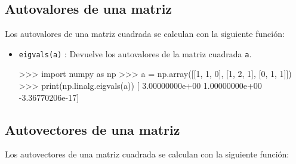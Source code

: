 \documentclass[
  spanish,
  a4paper,
]{scrreport}
\newenvironment{Shaded}{\begin{snugshade}}{\end{snugshade}}
\newcommand{\BuiltInTok}[1]{\textcolor[rgb]{0.00,0.23,0.31}{#1}}
\newcommand{\DecValTok}[1]{\textcolor[rgb]{0.68,0.00,0.00}{#1}}
\newcommand{\FloatTok}[1]{\textcolor[rgb]{0.68,0.00,0.00}{#1}}
\newcommand{\ImportTok}[1]{\textcolor[rgb]{0.00,0.46,0.62}{#1}}
\newcommand{\NormalTok}[1]{\textcolor[rgb]{0.00,0.23,0.31}{#1}}
\newcommand{\OperatorTok}[1]{\textcolor[rgb]{0.37,0.37,0.37}{#1}}
\begin{document}
\subsection{Autovalores de una matriz}\label{autovalores-de-una-matriz}

Los autovalores de una matriz cuadrada se calculan con la siguiente
función:

\begin{itemize}
\item
  \texttt{eigvals(a)} : Devuelve los autovalores de la matriz cuadrada
  \texttt{a}.

\begin{Shaded}
\begin{Highlighting}[]
\OperatorTok{\textgreater{}\textgreater{}\textgreater{}} \ImportTok{import}\NormalTok{ numpy }\ImportTok{as}\NormalTok{ np}
\OperatorTok{\textgreater{}\textgreater{}\textgreater{}}\NormalTok{ a }\OperatorTok{=}\NormalTok{ np.array([[}\DecValTok{1}\NormalTok{, }\DecValTok{1}\NormalTok{, }\DecValTok{0}\NormalTok{], [}\DecValTok{1}\NormalTok{, }\DecValTok{2}\NormalTok{, }\DecValTok{1}\NormalTok{], [}\DecValTok{0}\NormalTok{, }\DecValTok{1}\NormalTok{, }\DecValTok{1}\NormalTok{]])}
\OperatorTok{\textgreater{}\textgreater{}\textgreater{}} \BuiltInTok{print}\NormalTok{(np.linalg.eigvals(a))}
\NormalTok{[ }\FloatTok{3.00000000e+00}  \FloatTok{1.00000000e+00} \OperatorTok{{-}}\FloatTok{3.36770206e{-}17}\NormalTok{]}
\end{Highlighting}
\end{Shaded}
\end{itemize}

\subsection{Autovectores de una
matriz}\label{autovectores-de-una-matriz}

Los autovectores de una matriz cuadrada se calculan con la siguiente
función:
\end{document}
